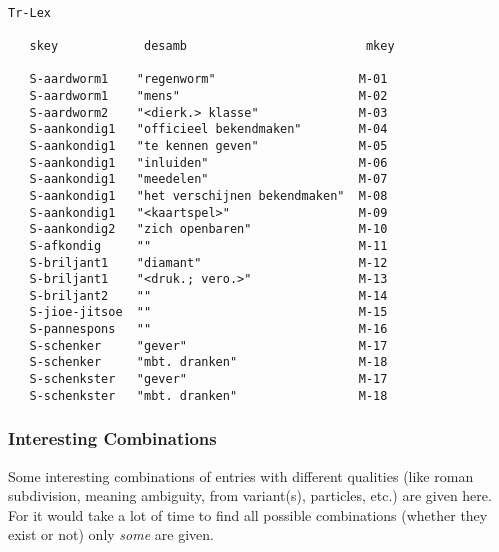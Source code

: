 \begin{verbatim}

Tr-Lex
    
   skey            desamb                         mkey
    
   S-aardworm1    "regenworm"                    M-01
   S-aardworm1    "mens"                         M-02
   S-aardworm2    "<dierk.> klasse"              M-03
   S-aankondig1   "officieel bekendmaken"        M-04
   S-aankondig1   "te kennen geven"              M-05
   S-aankondig1   "inluiden"                     M-06
   S-aankondig1   "meedelen"                     M-07
   S-aankondig1   "het verschijnen bekendmaken"  M-08
   S-aankondig1   "<kaartspel>"                  M-09
   S-aankondig2   "zich openbaren"               M-10
   S-afkondig     ""                             M-11
   S-briljant1    "diamant"                      M-12
   S-briljant1    "<druk.; vero.>"               M-13
   S-briljant2    ""                             M-14
   S-jioe-jitsoe  ""                             M-15
   S-pannespons   ""                             M-16
   S-schenker     "gever"                        M-17
   S-schenker     "mbt. dranken"                 M-18
   S-schenkster   "gever"                        M-17
   S-schenkster   "mbt. dranken"                 M-18
\end{verbatim}

\subsubsection{Interesting Combinations}

Some interesting combinations of entries with different qualities (like
roman subdivision, meaning ambiguity, from variant(s), particles, etc.)
are given here. For it would take a lot of time to find all possible 
combinations (whether they exist or not) only {\em some} are given.

